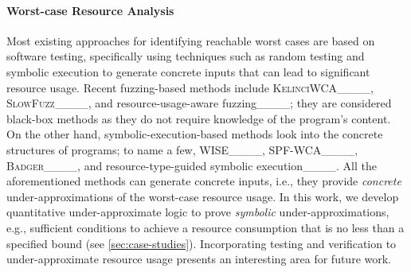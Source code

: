 \paragraph*{Worst-case Resource Analysis}
%
Most existing approaches for identifying reachable worst cases are based on software testing, specifically using techniques such as random testing and symbolic execution to generate concrete inputs that can lead to significant resource usage. 
%
Recent fuzzing-based methods include \textsc{KelinciWCA}____, \textsc{SlowFuzz}____, and resource-usage-aware fuzzing____; they are considered black-box methods as they do not require knowledge of the program's content.
%
On the other hand, symbolic-execution-based methods look into the concrete structures of programs; to name a few, WISE____, SPF-WCA____, \textsc{Badger}____, and resource-type-guided symbolic execution____.
%
All the aforementioned methods can generate concrete inputs, i.e., they provide \emph{concrete} under-approximations of the worst-case resource usage.
%
In this work, we develop quantitative under-approximate logic to prove \emph{symbolic} under-approximations, e.g., sufficient conditions to achieve a resource consumption that is no less than a specified bound (see \cref{sec:case-studies}).
%
Incorporating testing and verification to under-approximate resource usage presents an interesting area for future work.